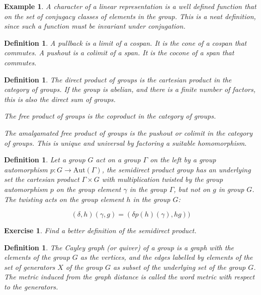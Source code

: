 \documentclass{tufte-book}
\newtheorem{definition}[theorem]{Definition}
\newtheorem{example}[theorem]{Example}
\newtheorem{exercise}[theorem]{Exercise}
\begin{document}
\begin{example}
  A character of a linear representation is a well defined function that on the set of conjugacy classes of elements in the group. This is a neat definition, since such a function must be invariant under conjugation.
\end{example}

\begin{definition}
  A pullback is a limit of a cospan. It is the cone of a cospan that commutes. 
  A pushout is a colimit of a span. It is the cocone of a span that commutes. 
\end{definition}

\begin{definition}
  The direct product of groups is the cartesian product in the category of groups. If the group is abelian, and there is a finite number of factors, this is also the direct sum of groups.

  The free product of groups is the coproduct in the category of groups.

  The amalgamated free product of groups is the pushout or colimit in the category of groups. This is unique and universal by factoring a suitable homomorphism.
\end{definition}

\begin{definition}
  Let a group $G$ act on a group $\Gamma$ on the left by a group automorphism $p : G \rightarrow \mathrm{Aut}(\Gamma)$, the semidirect product group has an underlying set the cartesian product $\Gamma \times G$ with multiplication twisted by the group automorphism $p$ on the group element $\gamma$ in the group $\Gamma$, but not on $g$ in group $G$. The twisting acts on the group element $h$ in the group $G$:

  \begin{equation}
    (\delta, h)(\gamma, g)
    = (\delta p(h)(\gamma), hg))
  \end{equation}
\end{definition}

\begin{exercise}
  Find a better definition of the semidirect product.
\end{exercise}

\begin{definition}
  The Cayley graph (or quiver) of a group is a graph with the elements of the group $G$ as the vertices, and the edges labelled by elements of the set of generators $X$ of the group $G$ as subset of the underlying set of the group $G$. The metric induced from the graph distance is called the word metric with respect to the generators.
\end{definition}
\end{document}
